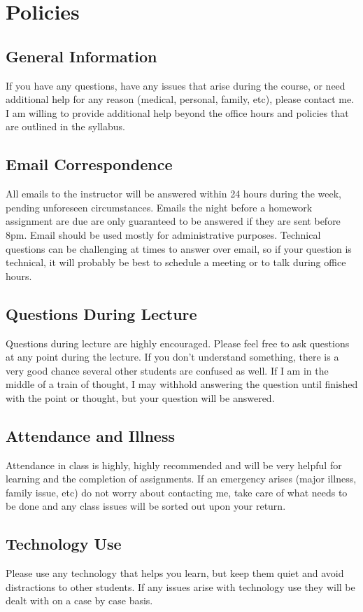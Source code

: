 \documentclass[12pt,letterpaper]{article}
\begin{document}
\section{Policies}
\subsection*{General Information}
If you have any questions, have any issues that arise during the course, or need additional help for any reason (medical, personal, family, etc), please contact me.
I am willing to provide additional help beyond the office hours and policies that are outlined in the syllabus.
\subsection*{Email Correspondence}
All emails to the instructor will be answered within 24 hours during the week, pending unforeseen circumstances.
Emails the night before a homework assignment are due are only guaranteed to be answered if they are sent before 8pm.
Email should be used mostly for administrative purposes.
Technical questions can be challenging at times to answer over email, so if your question is technical, it will probably be best to schedule a meeting or to talk during office hours.
\subsection*{Questions During Lecture}
Questions during lecture are highly encouraged.
Please feel free to ask questions at any point during the lecture.
If you don't understand something, there is a very good chance several other students are confused as well.
If I am in the middle of a train of thought, I may withhold answering the question until finished with the point or thought, but your question will be answered.
\subsection*{Attendance and Illness}
Attendance in class is highly, highly recommended and will be very helpful for learning and the completion of assignments.
If an emergency arises (major illness, family issue, etc) do not worry about contacting me, take care of what needs to be done and any class issues will be sorted out upon your return.
\subsection*{Technology Use}
Please use any technology that helps you learn, but keep them quiet and avoid distractions to other students.
If any issues arise with technology use they will be dealt with on a case by case basis.
\end{document}
